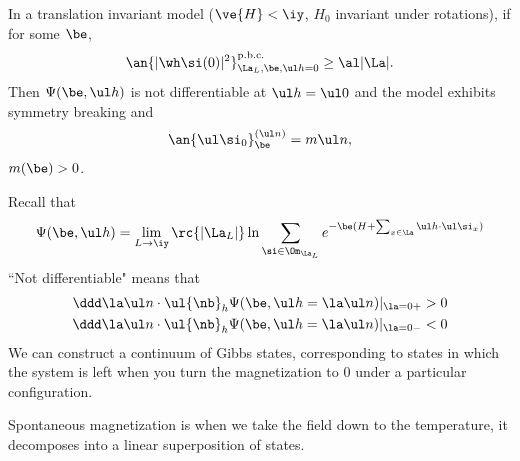 


\begin{thm}
In a translation invariant model ($\ve{H}<\iy$, $H_0$ invariant under rotations), if for some $\be$,
\[
\an{|\wh \si(0)|^2}_{\La_L,\be,\ul h=0}^{\text{p.b.c.}}\ge \al |\La|.
\]
Then $\Psi(\be, \ul h)$ is not differentiable at $\ul h=\ul 0$ and the model exhibits symmetry breaking and
\[
\an{\ul \si_0}_\be^{(\ul n)} = m \ul n,
\]
$m(\be)>0$.
\end{thm}
Recall that
\[
\Psi(\be, \ul h) = \lim_{L\to \iy} \rc{|\La_L|}\ln \sum_{\si\in \Om_{\La_L}} e^{-\be (H + \sum_{x\in \La} \ul h\cdot \ul \si_x)}
\]
``Not differentiable" means that 
\begin{align}
\ddd\la \ul n \cdot \ul{\nb}_h \Psi(\be, \ul h = \la \ul n) |_{\la = 0+} &>0\\
\ddd\la \ul n \cdot \ul{\nb}_h \Psi(\be, \ul h = \la \ul n) |_{\la = 0-} &<0
\end{align}
We can construct a continuum of Gibbs states, corresponding to states in which the system is left when you turn the magnetization to 0 under a particular configuration.

Spontaneous magnetization is %
when we take the field down to the temperature, it decomposes into a linear superposition of states.


